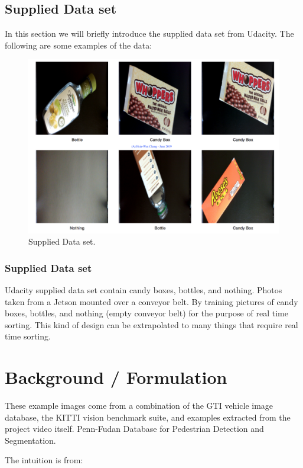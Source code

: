 \documentclass[10pt,journal,compsoc]{IEEEtran}
\begin{document}
\subsection{Supplied Data set}
In this section we will briefly introduce the supplied data set from Udacity.
The following are some examples of the data:
\begin{figure}[thpb]
      \centering
      \includegraphics[width=\linewidth]{suplieDataset.png}
      \caption{Supplied Data set.}
      \label{fig:robot1}
\end{figure}

\subsubsection{Supplied Data set}
Udacity supplied data set contain candy boxes, bottles, and nothing. Photos taken from a Jetson mounted over a conveyor belt. By training pictures of candy boxes, bottles, and nothing (empty conveyor belt) for the purpose of real time sorting. This kind of design can be extrapolated to many things that require real time sorting.

\section{Background / Formulation}

These example images come from a combination of the GTI vehicle image database, the KITTI vision benchmark suite, and examples extracted from the project video itself. Penn-Fudan Database for Pedestrian Detection and Segmentation.

 The intuition is from:
\end{document}
